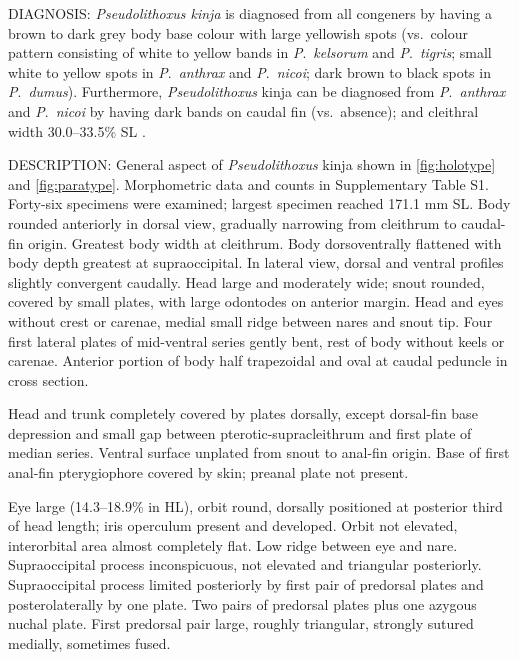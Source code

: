 \documentclass[12pt]{article}
\begin{document}
\noindent DIAGNOSIS: \emph{Pseudolithoxus kinja} is diagnosed from all congeners by having a brown to dark grey body base colour with large yellowish spots (vs.\ colour pattern consisting of white to yellow bands in \emph{P}.\ \emph{kelsorum} and \emph{P}.\ \emph{tigris}; small white to yellow spots in \emph{P}.\ \emph{anthrax} and \emph{P}.\ \emph{nicoi}; dark brown to black spots in \emph{P}.\ \emph{dumus}). %
Furthermore, \emph{Pseudolithoxus} kinja can be diagnosed from \emph{P}.\ \emph{anthrax} and \emph{P}.\ \emph{nicoi} by having dark bands on caudal fin (vs.\ absence); and cleithral width 30.0--33.5\% SL \citep[vs.\ 27.2--30.5\% in \emph{P}.\ \emph{anthrax} and 27.0--28.6\% in \emph{P}.\ \emph{nicoi}; data from ][]{Armbruster2000}.\\%
\bigskip

\noindent DESCRIPTION: General aspect of \emph{Pseudolithoxus} kinja shown in \autoref{fig:holotype} and \autoref{fig:paratype}. %
Morphometric data and counts in Supplementary Table S1. %
Forty-six specimens were examined; largest specimen reached 171.1 mm SL. %
Body rounded anteriorly in dorsal view, gradually narrowing from cleithrum to caudal-fin origin. %
Greatest body width at cleithrum. %
Body dorsoventrally flattened with body depth greatest at supraoccipital. %
In lateral view, dorsal and ventral profiles slightly convergent caudally. %
Head large and moderately wide; snout rounded, covered by small plates, with large odontodes on anterior margin. %
Head and eyes without crest or carenae, medial small ridge between nares and snout tip. %
Four first lateral plates of mid-ventral series gently bent, rest of body without keels or carenae. %
Anterior portion of body half trapezoidal and oval at caudal peduncle in cross section.%

Head and trunk completely covered by plates dorsally, except dorsal-fin base depression and small gap between pterotic-supracleithrum and first plate of median series. %
Ventral surface unplated from snout to anal-fin origin. %
Base of first anal-fin pterygiophore covered by skin; preanal plate not present.%

Eye large (14.3--18.9\% in HL), orbit round, dorsally positioned at posterior third of head length; iris operculum present and developed. %
Orbit not elevated, interorbital area almost completely flat. %
Low ridge between eye and nare. %
Supraoccipital process inconspicuous, not elevated and triangular posteriorly. %
Supraoccipital process limited posteriorly by first pair of predorsal plates and posterolaterally by one plate. %
Two pairs of predorsal plates plus one azygous nuchal plate. First predorsal pair large, roughly triangular, strongly sutured medially, sometimes fused.
\end{document}
